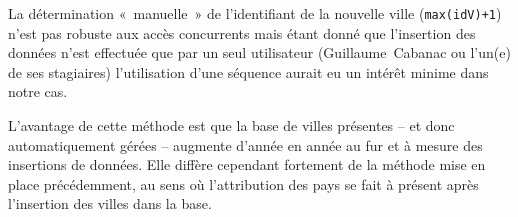 			
			
			La détermination «~manuelle~» de l'identifiant de la nouvelle ville (\texttt{max(idV)+1}) n'est pas robuste aux accès concurrents mais étant donné que l'insertion des données n'est effectuée que par un seul utilisateur (Guillaume~Cabanac ou l'un(e) de ses stagiaires) l'utilisation d'une séquence aurait eu un intérêt minime dans notre cas.
			
			L'avantage de cette méthode est que la base de villes présentes -- et donc automatiquement gérées -- augmente d'année en année au fur et à mesure des insertions de données. Elle diffère cependant fortement de la méthode mise en place précédemment, au sens où l'attribution des pays se fait à présent après l'insertion des villes dans la base.